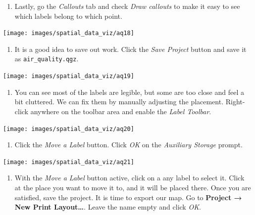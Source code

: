 \documentclass[
  12pt,
  a4paper]{article}
\providecommand{\tightlist}{%
  \setlength{\itemsep}{0pt}\setlength{\parskip}{0pt}}
\begin{document}
\begin{enumerate}
\def\labelenumi{\arabic{enumi}.}
\setcounter{enumi}{17}
\tightlist
\item
  Lastly, go the \emph{Callouts} tab and check \emph{Draw callouts} to
  make it easy to see which labels belong to which point.
\end{enumerate}

\begin{center}\texttt{[image: images/spatial\_data\_viz/aq18]} \end{center}

\begin{enumerate}
\def\labelenumi{\arabic{enumi}.}
\setcounter{enumi}{18}
\tightlist
\item
  It is a good idea to save out work. Click the \emph{Save Project}
  button and save it as \texttt{air\_quality.qgz}.
\end{enumerate}

\begin{center}\texttt{[image: images/spatial\_data\_viz/aq19]} \end{center}

\begin{enumerate}
\def\labelenumi{\arabic{enumi}.}
\setcounter{enumi}{19}
\tightlist
\item
  You can see most of the labels are legible, but some are too close and
  feel a bit cluttered. We can fix them by manually adjusting the
  placement. Right-click anywhere on the toolbar area and enable the
  \emph{Label Toolbar}.
\end{enumerate}

\begin{center}\texttt{[image: images/spatial\_data\_viz/aq20]} \end{center}

\begin{enumerate}
\def\labelenumi{\arabic{enumi}.}
\setcounter{enumi}{20}
\tightlist
\item
  Click the \emph{Move a Label} button. Click \emph{OK} on the
  \emph{Auxiliary Storage} prompt.
\end{enumerate}

\begin{center}\texttt{[image: images/spatial\_data\_viz/aq21]} \end{center}

\begin{enumerate}
\def\labelenumi{\arabic{enumi}.}
\setcounter{enumi}{21}
\tightlist
\item
  With the \emph{Move a Label} button active, click on a any label to
  select it. Click at the place you want to move it to, and it will be
  placed there. Once you are satisfied, save the project. It is time to
  export our map. Go to \textbf{Project → New Print Layout\ldots{}}.
  Leave the name empty and click \emph{OK}.
\end{enumerate}
\end{document}
